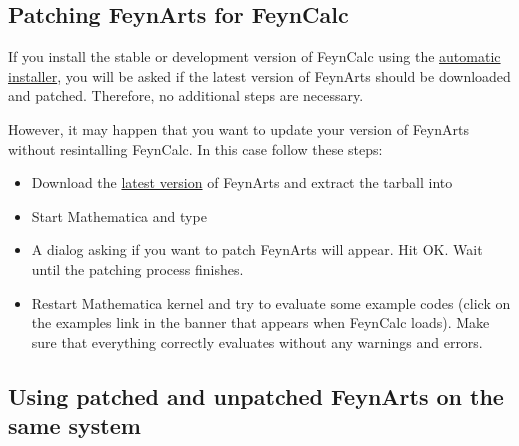 \documentclass[../FeynCalcManual.tex]{subfiles}
\begin{document}
\hypertarget{patching-feynarts-for-feyncalc}{%
\subsection{Patching FeynArts for
FeynCalc}\label{patching-feynarts-for-feyncalc}}

If you install the stable or development version of FeynCalc using the
\href{https://github.com/FeynCalc/feyncalc/wiki/Installation}{automatic
installer}, you will be asked if the latest version of FeynArts should
be downloaded and patched. Therefore, no additional steps are necessary.

However, it may happen that you want to update your version of FeynArts
without resintalling FeynCalc. In this case follow these steps:

\begin{itemize}
\item
  Download the \href{http://www.feynarts.de/}{latest version} of
  FeynArts and extract the tarball into

\begin{Shaded}
\begin{Highlighting}[]
\OperatorTok{[}\OperatorTok{]}
\end{Highlighting}
\end{Shaded}
\item
  Start Mathematica and type

\begin{Shaded}
\begin{Highlighting}[]
\ExtensionTok{=} \NormalTok{;}
\end{Highlighting}
\end{Shaded}
\item
  A dialog asking if you want to patch FeynArts will appear. Hit OK.
  Wait until the patching process finishes.
\item
  Restart Mathematica kernel and try to evaluate some example codes
  (click on the examples link in the banner that appears when FeynCalc
  loads). Make sure that everything correctly evaluates without any
  warnings and errors.
\end{itemize}

\hypertarget{using-patched-and-unpatched-feynarts-on-the-same-system}{%
\subsection{Using patched and unpatched FeynArts on the same
system}\label{using-patched-and-unpatched-feynarts-on-the-same-system}}
\end{document}
